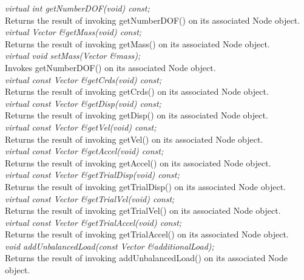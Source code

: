 {\em virtual int getNumberDOF(void) const;}\\
Returns the result of invoking getNumberDOF() on its associated
Node object. \\ 

{\em virtual Vector \&getMass(void) const;}\\
Returns the result of invoking getMass() on its associated
Node object. \\ 


{\em virtual void setMass(Vector \&mass);} \\
Invokes getNumberDOF() on its associated
Node object. \\ 


{\em virtual const Vector \&getCrds(void) const;}  \\
Returns the result of invoking getCrds() on its associated
Node object. \\ 

{\em  virtual const Vector \&getDisp(void) const;}  \\
Returns the result of invoking getDisp() on its associated
Node object. \\ 


{\em  virtual const Vector \&getVel(void) const;}  \\
Returns the result of invoking getVel() on its associated
Node object. \\ 


{\em  virtual const Vector \&getAccel(void) const;}  \\
Returns the result of invoking getAccel() on its associated
Node object. \\ 


{\em  virtual const Vector \&getTrialDisp(void) const;}  \\
Returns the result of invoking getTrialDisp() on its associated
Node object. \\ 


{\em  virtual const Vector \&getTrialVel(void) const;}  \\
Returns the result of invoking getTrialVel() on its associated
Node object. \\ 


{\em  virtual const Vector \&getTrialAccel(void) const;}  \\
Returns the result of invoking getTrialAccel() on its associated
Node object. \\ 


{\em void addUnbalancedLoad(const Vector \&additionalLoad);} \\
Returns the result of invoking addUnbalancedLoad() on its associated
Node object. \\ 

